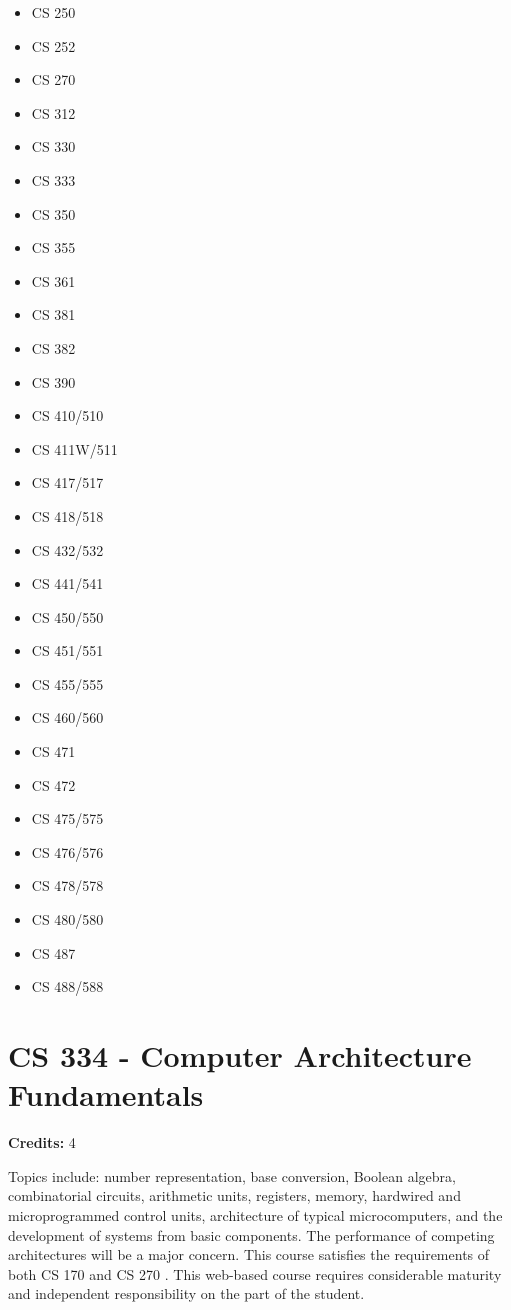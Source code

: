\documentclass[]{article}
\providecommand{\tightlist}{%
  \setlength{\itemsep}{0pt}\setlength{\parskip}{0pt}}
\begin{document}
\begin{multicols}{2}
\begin{itemize}
\tightlist
\item
  CS 250
\item
  CS 252
\item
  CS 270
\item
  CS 312
\item
  CS 330
\item
  CS 333
\item
  CS 350
\item
  CS 355
\item
  CS 361
\item
  CS 381
\item
  CS 382
\item
  CS 390
\item
  CS 410/510
\item
  CS 411W/511
\item
  CS 417/517
\item
  CS 418/518
\item
  CS 432/532
\item
  CS 441/541
\item
  CS 450/550
\item
  CS 451/551
\item
  CS 455/555
\item
  CS 460/560
\item
  CS 471
\item
  CS 472
\item
  CS 475/575
\item
  CS 476/576
\item
  CS 478/578
\item
  CS 480/580
\item
  CS 487
\item
  CS 488/588
\end{itemize}
\end{multicols}


\section{CS 334 - Computer Architecture
Fundamentals}\label{cs-334---computer-architecture-fundamentals}

\textbf{Credits:} 4

Topics include: number representation, base conversion, Boolean algebra,
combinatorial circuits, arithmetic units, registers, memory, hardwired
and microprogrammed control units, architecture of typical
microcomputers, and the development of systems from basic components.
The performance of competing architectures will be a major concern. This
course satisfies the requirements of both CS 170 and CS 270 . This
web-based course requires considerable maturity and independent
responsibility on the part of the student.
\end{document}
